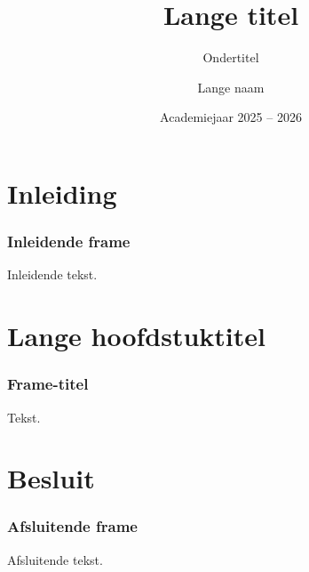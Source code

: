 \documentclass
[kulak,handout] %
{kulakbeamer}
\title[Korte titel]{Lange titel}
\subtitle{Ondertitel}
\author[Korte naam]{Lange naam}
\institute[Kulak]{KU Leuven Kulak}
\date{Academiejaar 2025 -- 2026}
\begin{document}
	
	\begin{titleframe}
		\titlepage
	\end{titleframe}
	
	\begin{outlineframe}[Overzicht]
		\tableofcontents
	\end{outlineframe}
	
	
	\section{Inleiding}
	
	\begin{frame}
		\frametitle{Inleidende frame}
		Inleidende tekst.
	\end{frame}
	
	\section[Korte titel]{Lange hoofdstuktitel}
	
	\begin{frame}
		\frametitle{Frame-titel}
		Tekst.
	\end{frame}
	
	\section{Besluit}
	\begin{frame}
		\frametitle{Afsluitende frame}
		Afsluitende tekst.
	\end{frame}
	
\end{document}
